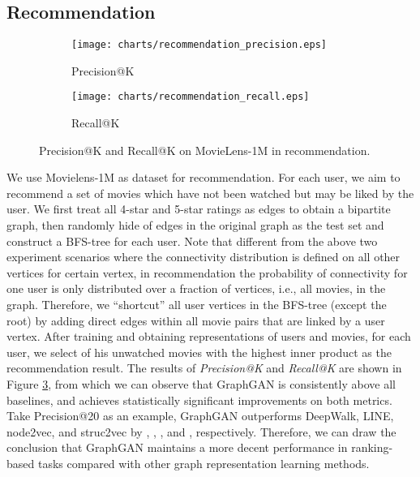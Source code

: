 \documentclass[letterpaper]{article}
\begin{document}
	
	\subsection{Recommendation}
		\begin{figure}
			\centering
			\begin{subfigure}[b]{0.23\textwidth}
   				\texttt{[image: charts/recommendation\_precision.eps]}
   				\caption{Precision@K}
   				\label{fig:precision}
			\end{subfigure}
			\hfill
			\begin{subfigure}[b]{0.23\textwidth}
				\texttt{[image: charts/recommendation\_recall.eps]}
				\caption{Recall@K}
				\label{fig:recall}
			\end{subfigure}
			\caption{Precision@K and Recall@K on MovieLens-1M in recommendation.}			
			\label{fig:recommendation}
		\end{figure}
		
		We use Movielens-1M as dataset for recommendation.
		For each user, we aim to recommend a set of movies which have not been watched but may be liked by the user.
		We first treat all 4-star and 5-star ratings as edges to obtain a bipartite graph, then randomly hide  of edges in the original graph as the test set and construct a BFS-tree for each user.
		Note that different from the above two experiment scenarios where the connectivity distribution is defined on all other vertices for certain vertex, in recommendation the probability of connectivity for one user is only distributed over a fraction of vertices, i.e., all movies, in the graph.
		Therefore, we ``shortcut'' all user vertices in the BFS-tree (except the root) by adding direct edges within all movie pairs that are linked by a user vertex.
		After training and obtaining representations of users and movies, for each user, we select  of his unwatched movies with the highest inner product as the recommendation result.
		The results of \textit{Precision@K} and \textit{Recall@K} are shown in Figure \ref{fig:recommendation}, from which we can observe that GraphGAN is consistently above all baselines, and achieves statistically significant improvements on both metrics.
		Take Precision@20 as an example, GraphGAN outperforms DeepWalk, LINE, node2vec, and struc2vec by , , , and , respectively.
		Therefore, we can draw the conclusion that GraphGAN maintains a more decent performance in ranking-based tasks compared with other graph representation learning methods.
		
		
	
\end{document}
